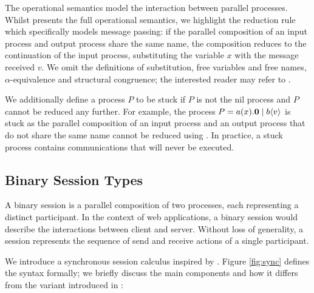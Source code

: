 The operational semantics model the interaction between parallel processes. Whilst \cite{C406Lecture} presents the full operational semantics, we highlight the  reduction rule which specifically models message passing:
if the parallel composition of an input process and output process share the same name, the composition reduces to the continuation of the input process, substituting the variable $x$ with the message received $v$. We omit the definitions of substitution, free variables and free names, $\alpha$-equivalence and structural congruence; the interested reader may refer to \cite{C406Lecture}.


We additionally define a process $P$ to be {stuck} if $P$ is not the nil process and $P$ cannot be reduced any further. For example, the process $P = {{a}({x})}.\mathbf{0} \mid {{b}\langle {v} \rangle}$ is stuck as the parallel composition of an input process and an output process that do not share the same name cannot be reduced using . In practice, a stuck process contains communications that will never be executed.

\subsection{Binary Session Types}\label{section_bst}
A {binary session} is a parallel composition of two processes, each representing a distinct participant.
In the context of web applications, a binary session would describe the interactions between client and server.
Without loss of generality, a {session} represents the sequence of send and receive actions of a single participant.

We introduce a {synchronous} session calculus inspired by \cite{MPST}. Figure \ref{fig:sync} defines the syntax formally; we briefly discuss the main components and how it differs from the variant introduced in \cite{C406Lecture}:

